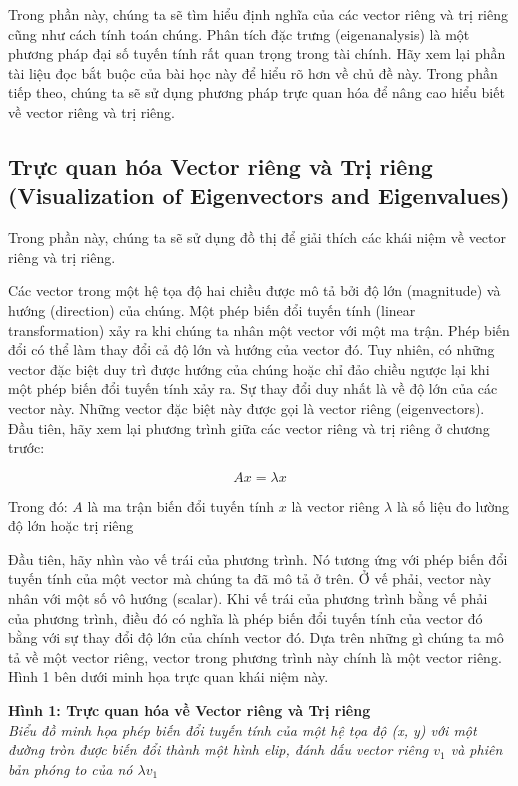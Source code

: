 Trong phần này, chúng ta sẽ tìm hiểu định nghĩa của các vector riêng và trị riêng cũng như cách tính toán chúng. Phân tích đặc trưng (eigenanalysis) là một phương pháp đại số tuyến tính rất quan trọng trong tài chính. Hãy xem lại phần tài liệu đọc bắt buộc của bài học này để hiểu rõ hơn về chủ đề này. Trong phần tiếp theo, chúng ta sẽ sử dụng phương pháp trực quan hóa để nâng cao hiểu biết về vector riêng và trị riêng.

\subsection[Trực quan hóa Vector riêng và Trị riêng]{Trực quan hóa Vector riêng và Trị riêng (Visualization of Eigenvectors and Eigenvalues)}

Trong phần này, chúng ta sẽ sử dụng đồ thị để giải thích các khái niệm về vector riêng và trị riêng.

Các vector trong một hệ tọa độ hai chiều được mô tả bởi độ lớn (magnitude) và hướng (direction) của chúng. Một phép biến đổi tuyến tính (linear transformation) xảy ra khi chúng ta nhân một vector với một ma trận. Phép biến đổi có thể làm thay đổi cả độ lớn và hướng của vector đó. Tuy nhiên, có những vector đặc biệt duy trì được hướng của chúng hoặc chỉ đảo chiều ngược lại khi một phép biến đổi tuyến tính xảy ra. Sự thay đổi duy nhất là về độ lớn của các vector này. Những vector đặc biệt này được gọi là vector riêng (eigenvectors). Đầu tiên, hãy xem lại phương trình giữa các vector riêng và trị riêng ở chương trước:

$$Ax=\lambda x$$

Trong đó:
$A$ là ma trận biến đổi tuyến tính
$x$ là vector riêng
$\lambda$ là số liệu đo lường độ lớn hoặc trị riêng

Đầu tiên, hãy nhìn vào vế trái của phương trình. Nó tương ứng với phép biến đổi tuyến tính của một vector mà chúng ta đã mô tả ở trên. Ở vế phải, vector này nhân với một số vô hướng (scalar). Khi vế trái của phương trình bằng vế phải của phương trình, điều đó có nghĩa là phép biến đổi tuyến tính của vector đó bằng với sự thay đổi độ lớn của chính vector đó. Dựa trên những gì chúng ta mô tả về một vector riêng, vector trong phương trình này chính là một vector riêng. Hình 1 bên dưới minh họa trực quan khái niệm này.

\textbf{Hình 1: Trực quan hóa về Vector riêng và Trị riêng} \\
\textit{Biểu đồ minh họa phép biến đổi tuyến tính của một hệ tọa độ (x, y) với một đường tròn được biến đổi thành một hình elip, đánh dấu vector riêng $v_1$ và phiên bản phóng to của nó $\lambda v_1$}

